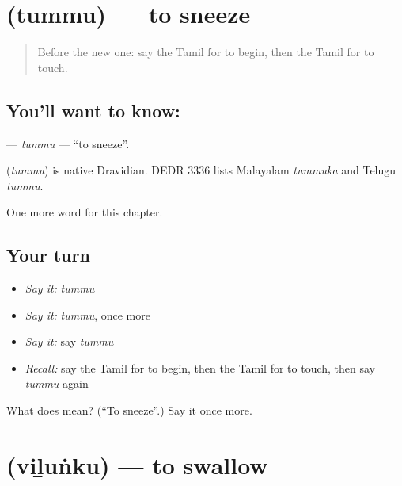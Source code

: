 \section[\texorpdfstring{\ta{தும்மு} (tummu)}{தும்மு (tummu)}]{ (tummu) — to sneeze}

\label{lesson:TA-C226-tummu}



\begin{quote}
Before the new one: say the Tamil for to begin, then the Tamil for to touch.
\end{quote}

\subsection*{You'll want to know: }
\textbf{} — \emph{tummu} — \textquotedblleft{}to sneeze\textquotedblright{}.

\begin{cousinweb}
\textbf{} (\emph{tummu}) is native Dravidian. DEDR 3336 lists Malayalam \emph{tummuka} and Telugu \emph{tummu}.
\end{cousinweb}

\begin{grammarlens}[title={What you've built}]
One more word for this chapter.
\end{grammarlens}

\subsection*{Your turn}
\begin{itemize}
\raggedright
  \item \emph{Say it:} \emph{tummu}
  \item \emph{Say it:} \emph{tummu}, once more
  \item \emph{Say it:} say \emph{tummu}
  \item \emph{Recall:} say the Tamil for to begin, then the Tamil for to touch, then say \emph{tummu} again
\end{itemize}

\begin{tcolorbox}[breakable,colback=teal!4,colframe=teal!35!black,title={Before you move on}]
What does  mean? (\textquotedblleft{}To sneeze\textquotedblright{}.) Say it once more.
\end{tcolorbox}
\section[\texorpdfstring{\ta{விழுங்கு} (viḻuṅku)}{விழுங்கு (viḻuṅku)}]{ (viḻuṅku) — to swallow}


